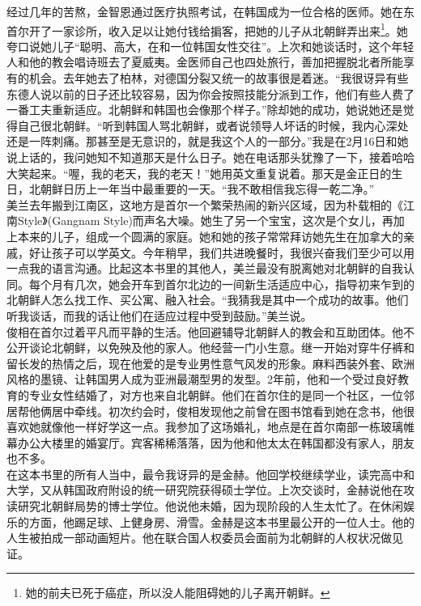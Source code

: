 经过几年的苦熬，金智恩通过医疗执照考试，在韩国成为一位合格的医师。她在东首尔开了一家诊所，收入足以让她付钱给掮客，把她的儿子从北朝鲜弄出来\footnote{她的前夫已死于癌症，所以没人能阻碍她的儿子离开朝鲜。}。她夸口说她儿子“聪明、高大，在和一位韩国女性交往”。上次和她谈话时，这个年轻人和他的教会唱诗班去了夏威夷。金医师自己也四处旅行，善加把握脱北者所能享有的机会。去年她去了柏林，对德国分裂又统一的故事很是着迷。“我很讶异有些东德人说以前的日子还比较容易，因为你会按照技能分派到工作，他们有些人费了一番工夫重新适应。北朝鲜和韩国也会像那个样子。”除却她的成功，她说她还是觉得自己很北朝鲜。“听到韩国人骂北朝鲜，或者说领导人坏话的时候，我内心深处还是一阵刺痛。那甚至是无意识的，就是我这个人的一部分。”我是在2月16日和她说上话的，我问她知不知道那天是什么日子。她在电话那头犹豫了一下，接着哈哈大笑起来。“喔，我的老天，我的老天！”她用英文重复说着。那天是金正日的生日，北朝鲜日历上一年当中最重要的一天。“我不敢相信我忘得一乾二净。”\\

美兰去年搬到江南区，这地方是首尔一个繁荣热闹的新兴区域，因为朴载相的《江南Style》(Gangnam Style)而声名大噪。她生了另一个宝宝，这次是个女儿，再加上本来的儿子，组成一个圆满的家庭。她和她的孩子常常拜访她先生在加拿大的亲戚，好让孩子可以学英文。今年稍早，我们共进晚餐时，我很兴奋我们至少可以用一点我的语言沟通。比起这本书里的其他人，美兰最没有脱离她对北朝鲜的自我认同。每个月有几次，她会开车到首尔北边的一间新生活适应中心，指导初来乍到的北朝鲜人怎么找工作、买公寓、融入社会。“我猜我是其中一个成功的故事。他们听我谈话，而我的话让他们在适应过程中受到鼓励。”美兰说。\\

俊相在首尔过着平凡而平静的生活。他回避辅导北朝鲜人的教会和互助团体。他不公开谈论北朝鲜，以免殃及他的家人。他经营一门小生意。继一开始对穿牛仔裤和留长发的热情之后，现在他爱的是专业男性意气风发的形象。麻料西装外套、欧洲风格的墨镜、让韩国男人成为亚洲最潮型男的发型。2年前，他和一个受过良好教育的专业女性结婚了，对方也来自北朝鲜。他们在首尔住的是同一个社区，一位邻居帮他俩居中牵线。初次约会时，俊相发现他之前曾在图书馆看到她在念书，他很喜欢她就像他一样好学这一点。我参加了这场婚礼，地点是在首尔南部一栋玻璃帷幕办公大楼里的婚宴厅。宾客稀稀落落，因为他和他太太在韩国都没有家人，朋友也不多。\\

在这本书里的所有人当中，最令我讶异的是金赫。他回学校继续学业，读完高中和大学，又从韩国政府附设的统一研究院获得硕士学位。上次交谈时，金赫说他在攻读研究北朝鲜局势的博士学位。他说他未婚，因为现阶段的人生太忙了。在休闲娱乐的方面，他踢足球、上健身房、滑雪。金赫是这本书里最公开的一位人士。他的人生被拍成一部动画短片。他在联合国人权委员会面前为北朝鲜的人权状况做见证。\\

